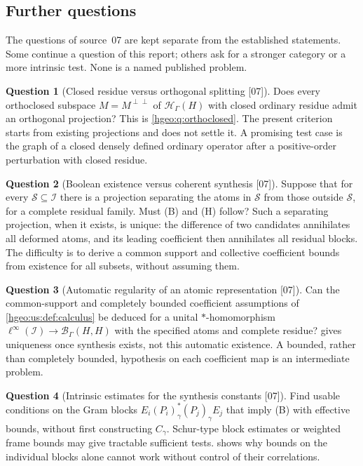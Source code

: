 \documentclass[11pt,letterpaper]{article}
\numberwithin{equation}{section}
\theoremstyle{definition}
\newtheorem{question}[question]{Question}
\theoremstyle{remark}
\newcommand{\HH}[1]{\mathscr H_\Gamma(#1)}
\newcommand{\BH}{\mathscr B_\Gamma(H,H)}
\newcommand{\src}[1]{\textup{\textsf{\small[#1]}}}
\begin{document}
\subsection{Further questions}\label{hgeo:us:sub:questions}
The questions of source~07 are kept separate from the established statements.
Some continue a question of this report; others ask for a stronger category or
a more intrinsic test. None is a named published problem.

\begin{question}[Closed residue versus orthogonal splitting
\src{07}]\label{hgeo:us:q:closedresidue}
Does every orthoclosed subspace $M=M^{\perp\perp}$ of $\HH{H}$ with closed
ordinary residue admit an orthogonal projection? This is
\cref{hgeo:q:orthoclosed}. The present criterion starts from existing
projections and does not settle it. A promising test case is the graph of a
closed densely defined ordinary operator after a positive-order perturbation
with closed residue.
\end{question}

\begin{question}[Boolean existence versus coherent synthesis
\src{07}]\label{hgeo:us:q:boolean}
Suppose that for every $\mathcal S\subseteq\mathcal I$ there is a projection
separating the atoms in $\mathcal S$ from those outside $\mathcal S$, for a
complete residual family. Must (B) and (H) follow? Such a separating
projection, when it exists, is unique: the difference of two candidates
annihilates all deformed atoms, and its leading coefficient then annihilates
all residual blocks. The difficulty is to derive a common support and
collective coefficient bounds from existence for all subsets, without assuming
them.
\end{question}

\begin{question}[Automatic regularity of an atomic representation
\src{07}]\label{hgeo:us:q:regularity}
Can the common-support and completely bounded coefficient assumptions of
\cref{hgeo:us:def:calculus} be deduced for a unital $*$-homomorphism
$\ell^\infty(\mathcal I)\to\BH$ with the specified atoms and complete residue?
 gives uniqueness once synthesis exists, not this
automatic existence. A bounded, rather than completely bounded, hypothesis on
each coefficient map is an intermediate problem.
\end{question}

\begin{question}[Intrinsic estimates for the synthesis constants
\src{07}]\label{hgeo:us:q:intrinsic}
Find usable conditions on the Gram blocks $E_i(P_i)_\gamma^*(P_j)_\gamma E_j$
that imply (B) with effective bounds, without first constructing $C_\gamma$.
Schur-type block estimates or weighted frame bounds may give tractable
sufficient tests.  shows why bounds on the
individual blocks alone cannot work without control of their correlations.
\end{question}
\end{document}
